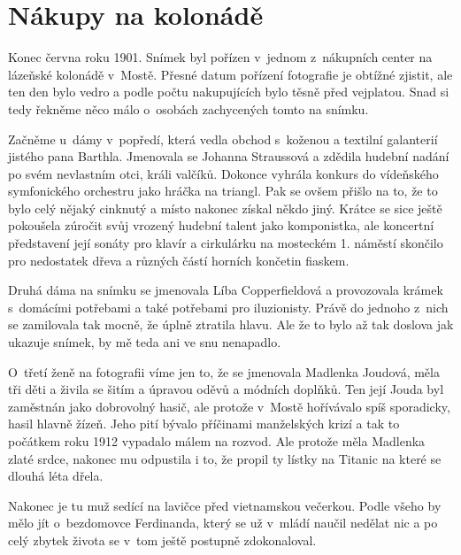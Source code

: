 
\chapter{Nákupy na kolonádě}

Konec června roku 1901. Snímek byl pořízen v~jednom z~nákupních center na
lázeňské kolonádě v~Mostě. Přesné datum pořízení fotografie je obtížné zjistit,
ale ten den bylo vedro a podle počtu nakupujících bylo těsně před vejplatou.
Snad si tedy řekněme něco málo o~osobách zachycených tomto na snímku.

Začněme u~dámy v~popředí, která vedla obchod s~koženou a textilní galanterií
jistého pana Barthla. Jmenovala se Johanna Straussová a zdědila hudební nadání
po svém nevlastním otci, králi valčíků. Dokonce vyhrála konkurs do vídeňského
symfonického orchestru jako hráčka na triangl. Pak se ovšem přišlo na to, že to
bylo celý nějaký cinknutý a místo nakonec získal někdo jiný. Krátce se sice
ještě pokoušela zúročit svůj vrozený hudební talent jako komponistka, ale
koncertní představení její sonáty pro klavír a cirkulárku na mosteckém 1.
náměstí skončilo pro nedostatek dřeva a různých částí horních končetin fiaskem.

Druhá dáma na snímku se jmenovala Líba Copperfieldová a provozovala krámek
s~domácími potřebami a také potřebami pro iluzionisty. Právě do jednoho z~nich
se zamilovala tak mocně, že úplně ztratila hlavu. Ale že to bylo až tak doslova
jak ukazuje snímek, by mě teda ani ve snu nenapadlo.

O~třetí ženě na fotografii víme jen to, že se jmenovala Madlenka Joudová, měla
tři děti a živila se šitím a úpravou oděvů a módních doplňků. Ten její Jouda
byl zaměstnán jako dobrovolný hasič, ale protože v~Mostě hořívávalo spíš
sporadicky, hasil hlavně žízeň. Jeho pití bývalo příčinami manželských krizí a
tak to počátkem roku 1912 vypadalo málem na rozvod. Ale protože měla Madlenka
zlaté srdce, nakonec mu odpustila i to, že propil ty lístky na Titanic na které
se dlouhá léta dřela.

Nakonec je tu muž sedící na lavičce před vietnamskou večerkou. Podle všeho by
mělo jít o~bezdomovce Ferdinanda, který se už v~mládí naučil nedělat nic a po
celý zbytek života se v~tom ještě postupně zdokonaloval.

